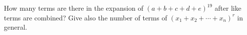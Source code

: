 How many terms are there in the expansion of $(a+b+c+d+e)^{19}$ after like terms are combined? Give also the number of terms of $(x_1+x_2+\cdots+x_n)^r$ in general.
